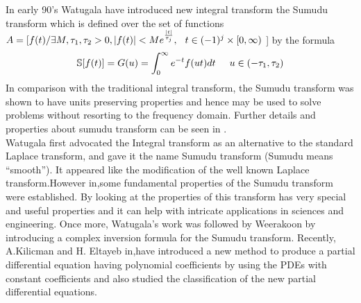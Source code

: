 \begin{large}
 In early 90's Watugala\cite{R90} have introduced new integral transform the Sumudu transform which is defined over the set of functions\\
 $A=[f(t)/\exists M,\tau_{1}, \tau_{2} > 0 ,|f(t)|< M e^{\frac{|t|}{\tau_{j}}} , \hspace*{0.25cm}  t \in (-1)^{j}\times[0,\infty)$ ] by the formula
 \begin{equation}
\mathbb{S}[f(t)] = G(u) = \int_{0}^{\infty}e^{-t}f(ut)dt   \hspace{0.5 cm} u \in (-\tau_{1}, \tau_{2})
 \end{equation} 
 In comparison with the traditional integral transform, the Sumudu transform was shown to have units preserving properties and hence may be used to solve problems without resorting to the frequency domain. Further details and properties about sumudu transform can be seen in \cite{R10,R11}.\\ 
Watugala first advocated the Integral transform as an alternative to the standard Laplace transform, and gave it the name Sumudu transform (Sumudu means “smooth”). It appeared like the modification of the well known Laplace transform.However in\cite{R15},some fundamental properties of the Sumudu transform were established. By looking at the properties of this transform has very special and useful properties and it can help with intricate applications in sciences and engineering. Once more, Watugala's work was followed by Weerakoon\cite{R95} by introducing a complex inversion formula for the Sumudu transform.  Recently, A.Kilicman and H. Eltayeb in\cite{R52},have introduced a new method to produce a partial differential equation having polynomial coefficients by using the PDEs with constant coefficients and also studied the classification of the new partial differential equations.\\


\end{large}
